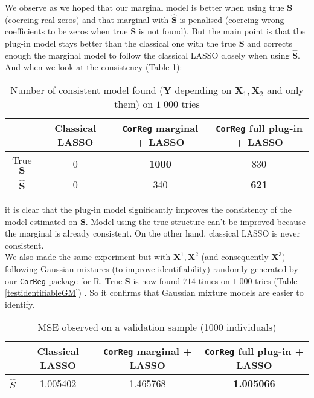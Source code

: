 \documentclass[12pt,a4paper]{report}
\begin{document}
		We observe as we hoped that our marginal model is better when using true $\boldsymbol{S}$ (coercing real zeros) and that marginal with $\hat{\boldsymbol{S}}$ is penalised (coercing wrong coefficients to be zeros when true $\boldsymbol{S}$ is not found).
		But the main point is that the plug-in model stays better than the classical one with the true $\boldsymbol{S}$ and corrects enough the marginal model to follow the classical LASSO closely when using $\hat{\boldsymbol{S}}$. 
		And when we look at the consistency (Table \ref{testidentifiableG}):
		\begin{table}[h!]	
		\centering
		\begin{tabular}{|c|c|c|c|}
		\hline 
		 & Classical LASSO & {\tt CorReg}  marginal + LASSO& {\tt CorReg}  full plug-in  + LASSO \\ 
		\hline 
		True $\boldsymbol{S}$ &  0 & \textbf{1000} & 830 \\ 
		\hline 
		$\hat{\boldsymbol{S}}$ & 0 & 340 & \textbf{621} \\ 
		\hline 
		\end{tabular} 
		\caption{Number of consistent model found ($\boldsymbol{Y}$ depending on $\boldsymbol{X}_1,\boldsymbol{X}_2$ and only them) on $1\;000$ tries}\label{testidentifiableG}
		\end{table}				
		it is clear that the plug-in model significantly improves the consistency of the model estimated on $\boldsymbol{S}$. Model using the true structure can't be improved because the marginal is already consistent. On the other hand, classical LASSO is never consistent.\\
		
		We also made the same experiment but with $\boldsymbol{X}^1,\boldsymbol{X}^2$ (and consequently $\boldsymbol{X}^3$) following Gaussian mixtures (to improve identifiability) randomly generated by our {\tt CorReg} package for R. 
		True $\boldsymbol{S}$ is now found $714$ times on $1\;000$ tries (Table \ref{testidentifiableGM}) . So it confirms that Gaussian mixture models are easier to identify.
		
		
		\begin{table}[h!]
		\centering
		\begin{tabular}{|c|c|c|c|}
		\hline 
		 & Classical LASSO & {\tt CorReg} marginal + LASSO& {\tt CorReg} full plug-in + LASSO \\ 
     	\hline 
		$\hat{S}$ & 1.005402 & 1.465768 & \textbf{1.005066} \\ 
		\hline 
		\end{tabular} 
		\caption{MSE observed on a validation sample (1000 individuals)}
		\end{table}
\end{document}
